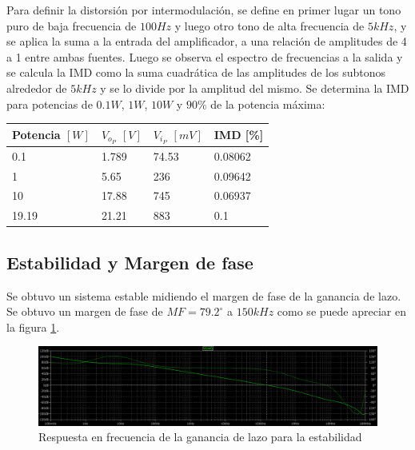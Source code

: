 \par Para definir la distorsión por intermodulación, se define en primer lugar un tono puro de baja frecuencia de $100Hz$ y luego otro tono de alta frecuencia de $5kHz$, y se aplica la suma a la entrada del amplificador, a una relación de amplitudes de 4 a 1 entre ambas fuentes. Luego se observa el espectro de frecuencias a la salida y se calcula la IMD como la suma cuadrática de las amplitudes de los subtonos alrededor de $5kHz$ y se lo divide por la amplitud del mismo. Se determina la IMD para potencias de $0.1W$, $1W$, $10W$ y $90\%$ de la potencia máxima:


\begin{table}[H]
\centering
\begin{tabular}{llll}
\hline\hline
Potencia $[W]$ & $V_{o_P}$ $[V]$ & $V_{i_P}$ $[mV]$ & IMD [\%]  \\\hline\hline
0.1     & 1.789      & 74.53         & 0.08062 \\
1       & 5.65      & 236        & 0.09642\\
10      & 17.88     & 745        & 0.06937\\
19.19   & 21.21     & 883        & 0.1\\
\hline \hline
\end{tabular}
\end{table}

\subsection{Estabilidad y Margen de fase}

\par Se obtuvo un sistema estable midiendo el margen de fase de la ganancia de lazo. Se obtuvo un margen de fase de $MF = 79.2^\circ$ a $150kHz$ como se puede apreciar en la figura \ref{fig::Estabilidad_MF}.

\begin{figure}[H]
        \centering
        \includegraphics[scale=0.5]{./Estabilidad_MF.png}
        \caption{Respuesta en frecuencia de la ganancia de lazo para la estabilidad}
        \label{fig::Estabilidad_MF}
\end{figure}

